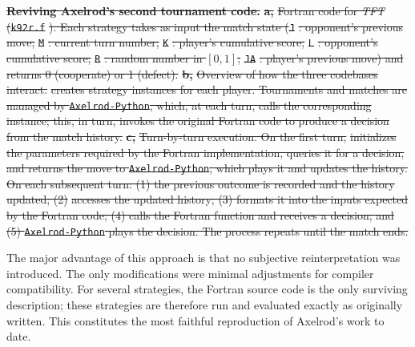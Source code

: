 \documentclass{article}
\newcommand{\TFT}{\emph{TFT}}
\newcommand{\AXL}{\texttt{Axelrod-Python}}
\newcommand{\AXLFortran}{\texttt{Axelrod\_fortran}}
\providecommand{\DIFdeltex}[1]{{\protect\color{red}\sout{#1}}}                      %
\providecommand{\DIFdelbegin}{} %
\providecommand{\DIFdelend}{} %
\providecommand{\DIFdelFL}[1]{\DIFdel{#1}} %
\providecommand{\DIFdel}[1]{\texorpdfstring{\DIFdeltex{#1}}{}} %
\newcommand{\DIFscaledelfig}{0.5}
\newlength{\DIFdelgraphicswidth} %
\newlength{\DIFdelgraphicsheight} %
\newcommand{\DIFdelincludegraphics}[2][]{%
\sbox{\DIFdelgraphicsbox}{\DIFOincludegraphics[#1]{#2}}%
\settoboxwidth{\DIFdelgraphicswidth}{\DIFdelgraphicsbox} %
\settoboxtotalheight{\DIFdelgraphicsheight}{\DIFdelgraphicsbox} %
\scalebox{\DIFscaledelfig}{%
\parbox[b]{\DIFdelgraphicswidth}{\usebox{\DIFdelgraphicsbox}\\[-\baselineskip] \rule{\DIFdelgraphicswidth}{0em}}\llap{\resizebox{\DIFdelgraphicswidth}{\DIFdelgraphicsheight}{%
\setlength{\unitlength}{\DIFdelgraphicswidth}%
\begin{picture}(1,1)%
\thicklines\linethickness{2pt} %
{\color[rgb]{1,0,0}\put(0,0){\framebox(1,1){}}}%
{\color[rgb]{1,0,0}\put(0,0){\line( 1,1){1}}}%
{\color[rgb]{1,0,0}\put(0,1){\line(1,-1){1}}}%
\end{picture}%
}\hspace*{3pt}}} %
} %
\DeclareRobustCommand{\DIFdelbegin}{\DIFOdelbegin \let\includegraphics\DIFdelincludegraphics} %
\DeclareRobustCommand{\DIFdelend}{\DIFOaddend \let\includegraphics\DIFOincludegraphics} %
\begin{document}
\DIFdelbegin %
{%
\textbf{\DIFdelFL{Reviving Axelrod's second tournament code.}}
\textbf{\DIFdelFL{a,}} %
\DIFdelFL{Fortran code for \TFT{} (}\texttt{\DIFdelFL{k92r.f}}%
\DIFdelFL{). Each strategy takes as input the match state
    (}\texttt{\DIFdelFL{J}}%
\DIFdelFL{: opponent's previous move; }\texttt{\DIFdelFL{M}}%
\DIFdelFL{: current turn number; }\texttt{\DIFdelFL{K}}%
\DIFdelFL{: player's cumulative score; }\texttt{\DIFdelFL{L}}%
\DIFdelFL{: opponent's cumulative score; }\texttt{\DIFdelFL{R}}%
\DIFdelFL{: random number in $[0,1]$; }\texttt{\DIFdelFL{JA}}%
\DIFdelFL{: player's previous move) and returns 0 (cooperate) or 1 (defect).
    }\textbf{\DIFdelFL{b,}} %
\DIFdelFL{Overview of how the three codebases interact. }%
\DIFdelFL{creates strategy instances for each
    player. Tournaments and matches are managed by \AXL{}, which, at each turn, calls
    the corresponding }%
\DIFdelFL{instance; this, in turn, invokes the original
    Fortran code to produce a decision from the match history.
    }\textbf{\DIFdelFL{c,}} %
\DIFdelFL{Turn-by-turn execution. On the first turn, }%
\DIFdelFL{initializes
    the parameters required by the Fortran implementation, queries it for a
    decision, and returns the move to \AXL{}, which plays it and updates the
    history. On each subsequent turn: (1) the previous outcome is recorded and the
    history updated; (2) }%
\DIFdelFL{accesses the updated history; (3) formats it
    into the inputs expected by the Fortran code; (4) calls the Fortran function and
    receives a decision; and (5) \AXL{} plays the decision. The process repeats until
    the match ends.}}

\DIFdelend The major advantage of this approach is that no subjective reinterpretation was
introduced. The only modifications were minimal adjustments for compiler
compatibility. For several strategies, the Fortran source code is the only
surviving description; these strategies are therefore run and evaluated exactly
as originally written. This constitutes the most faithful reproduction of
Axelrod's work to date.
\end{document}
